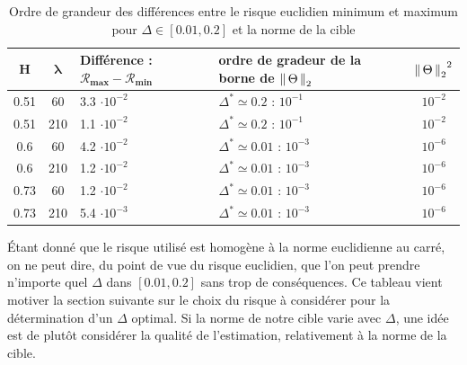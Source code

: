 \begin{table}[H]
	\centering
	\begin{tabularx}{0.7\textwidth}{|cc|X|X|c|}
		\toprule
		\textbf{H} & $\mathbf{\lambda}$ & \textbf{Différence : } $\mathbf{\mathcal R_{max} - \mathcal R_{min}}$ & ordre de gradeur de la borne de $\left\lVert \, \Theta \, \right\rVert _ {2}$ & ${\left\lVert \, \Theta \, \right\rVert _ {2}}^2$ \\
		\midrule
		0.51       & 60                 & 3.3 $\cdot 10^{-2}$                                                   & $\Delta^* \simeq 0.2$ : $10^{-1}$                 & $10^{-2}$             \\
		0.51       & 210                & 1.1 $\cdot 10^{-2}$                                                   & $\Delta^* \simeq 0.2$ : $10^{-1}$                 & $10^{-2}$             \\
		\midrule
		0.6        & 60                 & 4.2 $\cdot 10^{-2}$                                                   & $\Delta^* \simeq 0.01$ : $10^{-3}$                & $10^{-6}$             \\
		0.6        & 210                & 1.2 $\cdot 10^{-2}$                                                   & $\Delta^* \simeq 0.01$ : $10^{-3}$                & $10^{-6}$             \\
		\midrule
		0.73       & 60                 & 1.2 $\cdot 10^{-2}$                                                   & $\Delta^* \simeq 0.01$ : $10^{-3}$                & $10^{-6}$             \\
		0.73       & 210                & 5.4 $\cdot 10^{-3}$                                                   & $\Delta^* \simeq 0.01$ : $10^{-3}$                & $10^{-6}$             \\
		\bottomrule
	\end{tabularx}
	\caption{Ordre de grandeur des différences entre le risque euclidien minimum et maximum pour $\Delta \in [0.01, 0.2]$ et la norme de la cible}
	\label{tab:ordre_grandeur_diff_R_norme}
\end{table}

\noindent Étant donné que le risque utilisé est homogène à la norme euclidienne au carré, on ne peut dire, du point de vue du risque euclidien, que l'on peut prendre n'importe quel $\Delta$ dans $[0.01, 0.2]$ sans trop de conséquences.
Ce tableau vient motiver la section suivante sur le choix du risque à considérer pour la détermination d'un $\Delta$ optimal. Si la norme de notre cible varie avec $\Delta$, une idée est de plutôt considérer la qualité de l'estimation, relativement à la norme de la cible.



